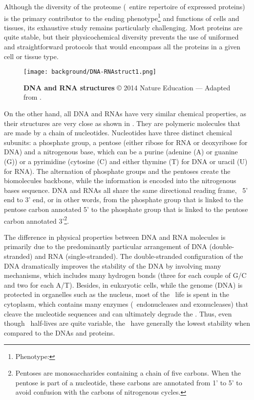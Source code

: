 Although the diversity of the proteome
(\ie\ entire repertoire of expressed proteins)
is the primary contributor to
the ending \gls{phenotype}\footnote{Phenotype: }
and functions of cells and tissues,
its exhaustive study remains particularly challenging.
Most proteins are quite stable,
but their physicochemical diversity prevents
the use of uniformed and straightforward protocols
that would encompass all the proteins
in a given cell or tissue type.~

\begin{figure}[!htbp]
    \texttt{[image: background/DNA-RNAstruct1.png]}\centering
    \vspace{-2mm}
    \caption[DNA and RNA structures]{\label{fig:DNARNAstruct}%
    \textbf{DNA and RNA structures} © 2014 Nature Education ---
    Adapted from \citet{Pierce2005-ib}.}
\end{figure}

On the other hand,
all \gls{DNA} and \glspl{RNA} have very similar chemical properties,
as their structures are very close as shown in .
They are polymeric molecules that are made by a chain of nucleotides.
Nucleotides have three distinct chemical subunits: a phosphate group,
a pentose (either ribose for \gls{RNA} or deoxyribose for \gls{DNA})
and a nitrogenous base, which can be a purine (adenine (A) or guanine (G))
or a pyrimidine (cytosine (C) and
either thymine (T) for \gls{DNA} or uracil (U) for \gls{RNA}).
The alternation of phosphate groups and the pentoses create the biomolecules backbone,
while the information is encoded into the nitrogenous bases sequence.
\gls{DNA} and \glspl{RNA} all share the same directional reading frame,
\ie\ 5' end to 3' end, or in other words,
from the phosphate group that is linked to the pentose carbon annotated 5'
to the phosphate group
that is linked to the pentose carbon annotated 3'\footnote{%
Pentoses are monosaccharides containing a chain of five carbons.
When the pentose is part of a nucleotide,
these carbons are annotated from 1' to 5' to avoid confusion
with the carbons of nitrogenous cycles.}.~

The difference in physical properties between \gls{DNA} and
\gls{RNA} molecules is primarily due to
the predominantly particular arrangement of \gls{DNA} (double-stranded) and
\gls{RNA} (single-stranded).
The double-stranded configuration of the \gls{DNA} dramatically improves
the stability of the \gls{DNA} by involving many mechanisms,
which includes many hydrogen bonds
(three for each couple of G/C and two for each A/T).
Besides,
in eukaryotic cells,
while the genome (\gls{DNA}) is protected in organelles such as the nucleus,
most of the \mRNAs\ life is spent in the cytoplasm,
which contains many enzymes (\eg\ endonucleases and exonucleases)
that cleave the nucleotide sequences and can ultimately degrade the \mRNAs.
Thus, even though \mRNAs\ half-lives are quite variable,
the \mRNAs\ have generally the lowest stability
when compared to the \glspl{DNA} and proteins.~

